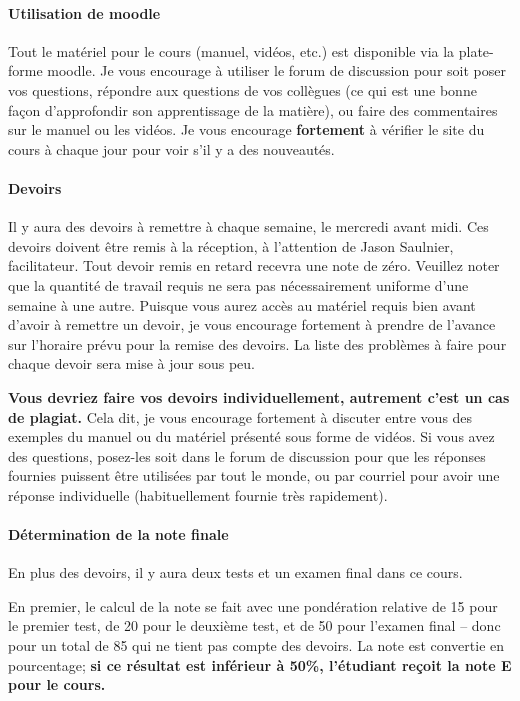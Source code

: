 \documentclass[11pt]{article}
\begin{document}
\paragraph*{Utilisation de moodle}  Tout le matériel pour le cours (manuel, vidéos, etc.) est disponible via la plate-forme moodle. 
Je vous encourage à utiliser le forum de discussion pour soit poser vos questions, répondre aux questions de vos collègues
(ce qui est une bonne façon d'approfondir son apprentissage de la matière), ou faire des commentaires sur le manuel ou les vidéos.
Je vous encourage \textbf{fortement} à vérifier le site du cours à chaque jour pour voir s'il y a des nouveautés.

\paragraph*{Devoirs} Il y aura des devoirs à remettre à chaque semaine, le mercredi avant midi. 
Ces devoirs doivent être remis à la réception, à l'attention de Jason Saulnier, facilitateur.
 Tout devoir remis en retard recevra une note de zéro.   
 Veuillez noter que la quantité de travail requis ne sera pas nécessairement uniforme d'une semaine à une autre.  
 Puisque vous aurez accès au matériel requis bien avant d'avoir à remettre un devoir,
  je vous encourage fortement à prendre de l'avance sur l'horaire prévu pour la remise des devoirs.  
  La liste des problèmes à faire pour chaque devoir sera mise à jour sous peu.

{\bf Vous devriez faire vos devoirs individuellement, autrement c'est un cas de plagiat.}  Cela dit, je vous encourage fortement à discuter entre vous des exemples du manuel ou
du matériel présenté sous forme de vidéos.   Si vous avez des questions, posez-les soit dans le forum de discussion pour que
les réponses fournies puissent être utilisées par tout le monde, ou par courriel pour avoir une réponse individuelle (habituellement fournie très rapidement).

\paragraph*{Détermination de la note finale} En plus des devoirs, il y aura deux tests et un examen final dans ce cours.

En premier, le calcul de la note se fait avec une pondération relative de 15 pour le premier test,
de 20 pour le deuxième test, et de 50 pour l'examen final -- donc pour un total de 85 qui ne tient
pas compte des devoirs.  La note est
convertie en pourcentage; \textbf{si ce résultat est inférieur à 50\%, l'étudiant reçoit la note E pour le cours.}
\end{document}
